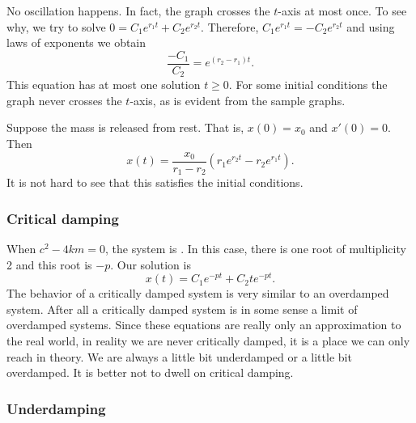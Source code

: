 
No oscillation happens.  In fact, the graph crosses the
$t$-axis at most once.  To see why, we try to solve
$0 = C_1 e^{r_1 t} + C_2 e^{r_2 t}$.
Therefore, $C_1 e^{r_1 t} = - C_2 e^{r_2 t}$ and using laws of exponents we
obtain
\begin{equation*}
\frac{-C_1}{C_2} = e^{(r_2-r_1) t} .
\end{equation*}
This equation has at most one solution $t \geq 0$.
For some initial conditions the graph never crosses the $t$-axis, as is
evident from the sample graphs.

\begin{example}
Suppose the mass is released from rest.  That is,
$x(0) = x_0$ and $x'(0) = 0$.
Then
\begin{equation*}
x(t) = \frac{x_0}{r_1-r_2} \left(r_1 e^{r_2 t} - r_2 e^{r_1 t} \right) .
\end{equation*}
It is not hard to see that this satisfies the initial conditions.
\end{example}

\subsubsection{Critical damping}

When
$c^2 - 4km = 0$, the system is \emph{}.  In this case,
there is one root of multiplicity 2 and this root is $-p$.  Our solution is
\begin{equation*}
x(t) = C_1 e^{-pt} + C_2 t e^{-pt} .
\end{equation*}
The behavior of a critically damped system is very similar to an overdamped
system.  After all a critically damped system is in some sense a limit
of overdamped systems.  Since these equations are really only an
approximation to the real world, in reality we are never critically
damped, it is a place we can only reach in theory.  We are always
a little bit underdamped or a little bit overdamped.  It is better not to
dwell on critical damping.

\subsubsection{Underdamping}


